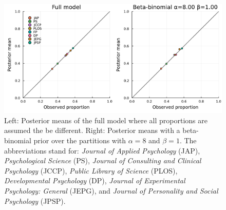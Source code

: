 \documentclass[11pt,a4paper]{article}
\theoremstyle{definition} %
\theoremstyle{case}
\newcommand{\FD}[1]{\textcolor{red}{Fabian: #1 }}
\begin{document}
\begin{figure}
    \centering
    \includegraphics[width=\textwidth]{figures/demo_proportions_retrieval_plots_full_bb.pdf}
    \caption{Left: Posterior means of the full model where all proportions are assumed the be different. Right: Posterior means with a beta-binomial prior over the partitions with $\alpha = 8$ and $\beta = 1$. The abbreviations stand for: 
    \emph{Journal of Applied Psychology} (JAP), \emph{Psychological Science} (PS), \emph{Journal of Consulting and Clinical Psychology} (JCCP), \emph{ Public Library of Science} (PLOS), \emph{Developmental Psychology} (DP), \emph{Journal of Experimental Psychology: General} (JEPG), and \emph{Journal of Personality and Social Psychology} (JPSP).}
    \label{fig:demo_proportions}
\end{figure}


\end{document}
